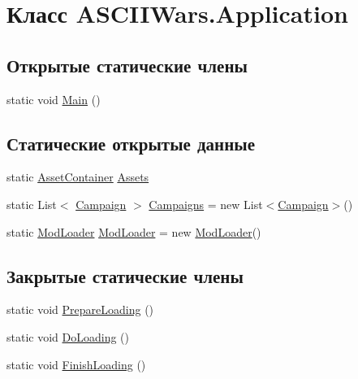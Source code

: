 \hypertarget{class_a_s_c_i_i_wars_1_1_application}{}\section{Класс A\+S\+C\+I\+I\+Wars.\+Application}
\label{class_a_s_c_i_i_wars_1_1_application}
\subsection*{Открытые статические члены}
\begin{DoxyCompactItemize}
\item 
static void \hyperlink{class_a_s_c_i_i_wars_1_1_application_a12dbc4ab81c994876ce7bd2664eee54f}{Main} ()
\end{DoxyCompactItemize}
\subsection*{Статические открытые данные}
\begin{DoxyCompactItemize}
\item 
static \hyperlink{class_a_s_c_i_i_wars_1_1_game_1_1_asset_container}{Asset\+Container} \hyperlink{class_a_s_c_i_i_wars_1_1_application_a85f064f508e8f2448220b04da2ed903c}{Assets}
\item 
static List$<$ \hyperlink{class_a_s_c_i_i_wars_1_1_game_1_1_campaign}{Campaign} $>$ \hyperlink{class_a_s_c_i_i_wars_1_1_application_a42f4ba2e41b2d237ce889719e8f85d0f}{Campaigns} = new List$<$\hyperlink{class_a_s_c_i_i_wars_1_1_game_1_1_campaign}{Campaign}$>$()
\item 
static \hyperlink{class_a_s_c_i_i_wars_1_1_modding_1_1_mod_loader}{Mod\+Loader} \hyperlink{class_a_s_c_i_i_wars_1_1_application_ad41fb53e9ffd835c97c5f746134fbb62}{Mod\+Loader} = new \hyperlink{class_a_s_c_i_i_wars_1_1_modding_1_1_mod_loader}{Mod\+Loader}()
\end{DoxyCompactItemize}
\subsection*{Закрытые статические члены}
\begin{DoxyCompactItemize}
\item 
static void \hyperlink{class_a_s_c_i_i_wars_1_1_application_a17ad0a44229caa1044d99f975ed97be3}{Prepare\+Loading} ()
\item 
static void \hyperlink{class_a_s_c_i_i_wars_1_1_application_a264d79af3a0048eef7ff8f864fdec698}{Do\+Loading} ()
\item 
static void \hyperlink{class_a_s_c_i_i_wars_1_1_application_a56252f7621e7b373696a7a79d09a052f}{Finish\+Loading} ()
\end{DoxyCompactItemize}


